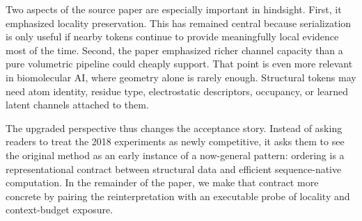Two aspects of the source paper are especially important in hindsight. First, it emphasized locality preservation. This has remained central because serialization is only useful if nearby tokens continue to provide meaningfully local evidence most of the time. Second, the paper emphasized richer channel capacity than a pure volumetric pipeline could cheaply support. That point is even more relevant in biomolecular AI, where geometry alone is rarely enough. Structural tokens may need atom identity, residue type, electrostatic descriptors, occupancy, or learned latent channels attached to them.

The upgraded perspective thus changes the acceptance story. Instead of asking readers to treat the 2018 experiments as newly competitive, it asks them to see the original method as an early instance of a now-general pattern: ordering is a representational contract between structural data and efficient sequence-native computation. In the remainder of the paper, we make that contract more concrete by pairing the reinterpretation with an executable probe of locality and context-budget exposure.
